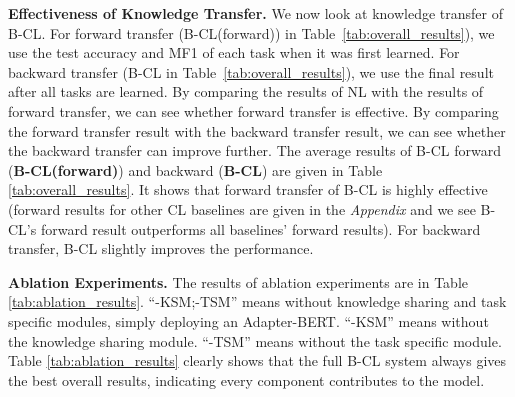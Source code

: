 \documentclass[11pt]{article}
\begin{document}
\textbf{Effectiveness of Knowledge Transfer.}
We now look at knowledge transfer of B-CL. For forward transfer (B-CL(forward)) in Table~\ref{tab:overall_results}), we use the test accuracy and MF1 of each task when it was first learned. For backward transfer (B-CL in Table~\ref{tab:overall_results}), we use the final result after all tasks are learned. By comparing the results of NL with the results of forward transfer, we can see whether forward transfer is effective. By comparing the forward transfer result with the backward transfer result, we can see whether the backward transfer can improve further. 
{\color{black}The average results of B-CL forward (\textbf{B-CL(forward)}) and backward (\textbf{B-CL}) are given in Table \ref{tab:overall_results}. It shows that forward transfer of B-CL is highly effective} (forward results for other CL baselines are given in the \textit{Appendix} and we see B-CL's forward result outperforms all baselines' forward results). For backward transfer, B-CL slightly improves the performance.










\textbf{Ablation Experiments.} 
The results of ablation experiments are in Table \ref{tab:ablation_results}. ``-KSM;-TSM'' means without knowledge sharing and task specific modules, simply deploying an Adapter-BERT. ``-KSM'' means without the knowledge sharing module. ``-TSM'' means without the task specific module. Table \ref{tab:ablation_results} clearly shows that the full B-CL system always gives the best overall results, indicating every component contributes to the model. 






\begin{table}[]
\centering
{}
\caption{Ablation experiment results.}
\label{tab:ablation_results}
\vspace{-4mm}
\end{table}
\end{document}
